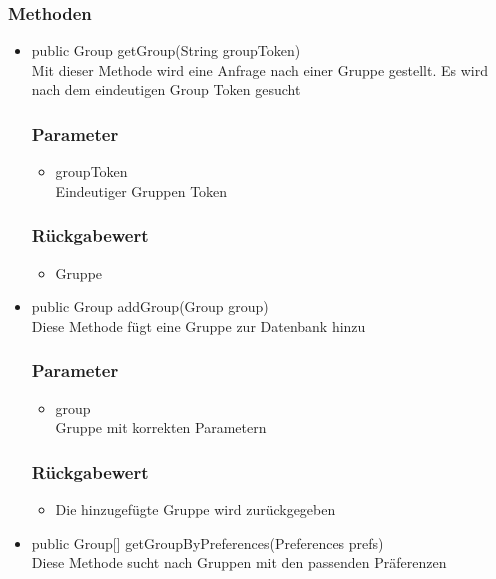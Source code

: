 \documentclass[a4paper]{scrreprt}
\begin{document}
\subsubsection*{Methoden}
\begin{addmargin}[25pt]{0pt}
\begin{itemize}

\item public Group getGroup(String groupToken)\\
	Mit dieser Methode wird eine Anfrage nach einer Gruppe gestellt. Es wird nach dem eindeutigen Group Token gesucht
	\subsubsection*{Parameter}
	\begin{itemize}
	\item groupToken \\
		Eindeutiger Gruppen Token
	\end{itemize}
	\subsubsection*{Rückgabewert}
	\begin{itemize}
	\item Gruppe 
	\end{itemize}
	
\item public Group addGroup(Group group)\\
	Diese Methode fügt eine Gruppe zur Datenbank hinzu
	\subsubsection*{Parameter}
	\begin{itemize}
	\item group \\
		Gruppe mit korrekten Parametern
	\end{itemize}
	\subsubsection*{Rückgabewert}
	\begin{itemize}
	\item Die hinzugefügte Gruppe wird zurückgegeben
	\end{itemize}
	
\item public Group[] getGroupByPreferences(Preferences prefs)\\
	Diese Methode sucht nach Gruppen mit den passenden Präferenzen

\end{itemize}
\end{addmargin}
\end{document}
